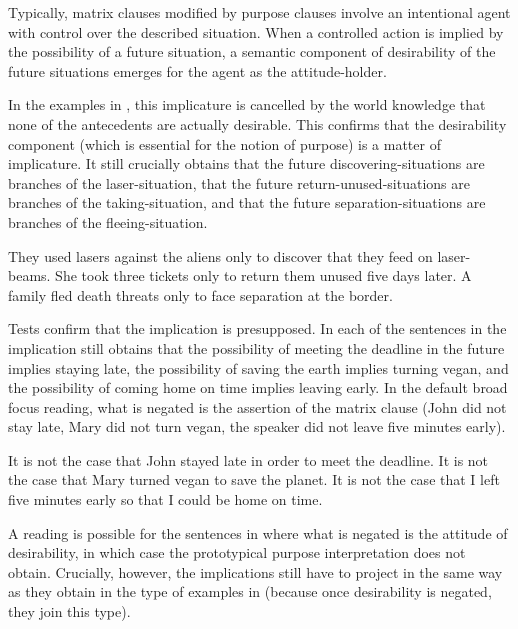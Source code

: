 \documentclass[output=paper,
colorlinks,
citecolor=brown,
newtxmath
]{langscibook}
\begin{document}
Typically, matrix clauses modified by purpose clauses involve an intentional agent with control over the described situation. When a controlled action is implied by the possibility of a future situation, a semantic component of desirability of the future situations emerges for the agent as the attitude-holder.

In the examples in , this implicature is cancelled by the world knowledge that none of the antecedents are actually desirable. This confirms that the desirability component (which is essential for the notion of purpose) is a matter of implicature. It still crucially obtains that the future discovering-situations are branches of the laser-situation, that the future return-unused-situations are branches of the taking-situation, and that the future separation-situations are branches of the fleeing-situation.

\ea\label{ex:NoPurpose}
\ea They used lasers against the aliens only to discover that they feed on laser-beams.
\ex She took three tickets only to return them unused five days later.
\ex A family fled death threats only to face separation at the border.\label{ex:NoPurpose-c}
\z\z

\noindent Tests confirm that the implication is presupposed. In each of the sentences in  the implication still obtains that the possibility of meeting the deadline in the future implies staying late, the possibility of saving the earth implies turning vegan, and the possibility of coming home on time implies leaving early. In the default broad focus reading, what is negated is the assertion of the matrix clause (John did not stay late, Mary did not turn vegan, the speaker did not leave five minutes early).

\ea\label{ex:PresupTest5}
\ea It is not the case that John stayed late in order to meet the deadline.\label{ex:PresupTest5-a}
\ex It is not the case that Mary turned vegan to save the planet.\label{ex:PresupTest5-b}
\ex It is not the case that I left five minutes early so that I could be home on time.\label{ex:PresupTest5-c}
\z\z

\noindent A reading is possible for the sentences in  where what is negated is the attitude of desirability, in which case the prototypical purpose interpretation does not obtain. Crucially, however, the implications still have to project in the same way as they obtain in the type of examples in  (because once desirability is negated, they join this type).
\end{document}
